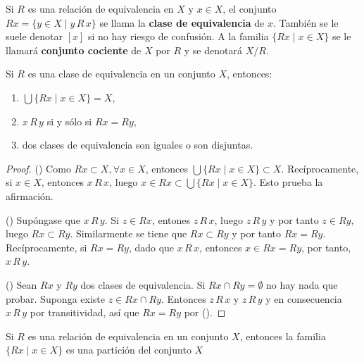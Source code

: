 

\begin{definition}
Si $R$ es una relación de equivalencia en $X$ y $x \in X$, el conjunto $R x = \{ y \in X \mid y \, R \, x \}$ se llama la \textbf{clase de equivalencia} de $x$. También se le suele denotar $[x]$ si no hay riesgo de confusión. A la familia $\{ R x \mid x \in X \}$ se le llamará \textbf{conjunto cociente} de $X$ por $R$ y se denotará $X/R$.
\end{definition}

\begin{theorem}
Si $R$ es una clase de equivalencia en un conjunto $X$, entonces:
\begin{enumerate}[label=\textnormal{(\roman*)}]
\item $\bigcup \{ R x \mid x \in X \} = X$,
\item $x \, R \, y$ si y sólo si $R x = R y$,
\item dos clases de equivalencia son iguales o son disjuntas.
\end{enumerate}
\end{theorem}

\begin{proof}
({\scshape{}}) Como $R x \subset X, \forall x \in X$, entonces $\bigcup \{ R x \mid x \in X \} \subset X$. Recíprocamente, si $x \in X$, entonces $x \, R \, x$, luego $x \in R x \subset \bigcup \{ R x \mid x \in X \}$. Esto prueba la afirmación.
\bigskip

({\scshape{}}) Supóngase que $x \, R \, y$. Si $z \in R x$, entones $z \, R \, x$, luego $z \, R \, y$ y por tanto $z \in R y$, luego $R x \subset R y$. Similarmente se tiene que $R x \subset R y$ y por tanto $R x = R y$. Recíprocamente, si $R x = R y$, dado que $x \, R \, x$, entonces $x \in R x = R y$, por tanto, $x \, R \, y$.
\bigskip

({\scshape{}}) Sean $R x$ y $R y$ dos clases de equivalencia. Si $R x \cap R y = \emptyset$ no hay nada que probar. Suponga existe $z \in R x \cap R y$. Entonces $z \, R \, x$ y $z \, R \, y$ y en consecuencia $x \, R \, y$ por transitividad, así que $R x = R y$ por ({\scshape{}}).
\end{proof}

\begin{corollary}
Si $R$ es una relación de equivalencia en un conjunto $X$, entonces la familia $\{ R x \mid x \in X \}$ es una partición del conjunto $X$
\end{corollary}
